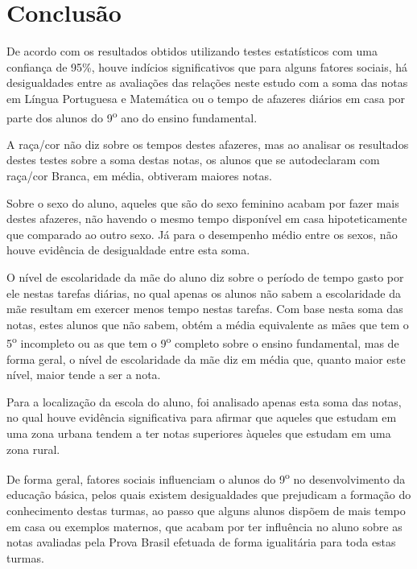 
\chapter{Conclusão}

De acordo com os resultados obtidos utilizando testes estatísticos com uma confiança de 95\%, 
houve indícios significativos que para alguns fatores sociais,
há desigualdades entre as avaliações das relações neste estudo com a soma das notas em Língua
Portuguesa e Matemática ou o tempo de afazeres diários em casa por parte dos alunos do 9\textsuperscript{o} ano
do ensino fundamental.

A raça/cor não diz sobre os tempos destes afazeres, mas ao analisar os resultados destes testes sobre a soma destas notas,
os alunos que se autodeclaram com raça/cor Branca, em média, obtiveram maiores notas.

Sobre o sexo do aluno, aqueles que são do sexo feminino acabam por fazer mais destes afazeres, não havendo
o mesmo tempo disponível em casa hipoteticamente que comparado ao outro sexo. Já para o desempenho médio entre os sexos,
não houve evidência de desigualdade entre esta soma. 

O nível de escolaridade da mãe do aluno diz sobre o período de tempo gasto por ele nestas tarefas diárias,
no qual apenas os alunos não sabem a escolaridade da mãe resultam em exercer menos tempo nestas tarefas.
Com base nesta soma das notas, estes alunos que não sabem, obtém a média equivalente as mães que tem o 5\textsuperscript{o}
incompleto ou as que tem o 9\textsuperscript{o} completo sobre o ensino fundamental, mas de forma geral,
o nível de escolaridade da mãe diz em média que, quanto maior este nível, maior tende a ser a nota.

Para a localização da escola do aluno, foi analisado apenas esta soma das notas, no qual houve evidência
significativa para afirmar que aqueles que estudam em uma zona urbana tendem a ter notas superiores àqueles
que estudam em uma zona rural. 

De forma geral, fatores sociais influenciam o alunos do 9\textsuperscript{o} no desenvolvimento da educação básica,
pelos quais existem desigualdades que prejudicam a formação do conhecimento destas turmas,
ao passo que alguns alunos dispõem de mais tempo em casa ou exemplos maternos, que acabam por ter influência no aluno sobre as 
notas avaliadas pela Prova Brasil efetuada de forma igualitária para toda estas turmas.

